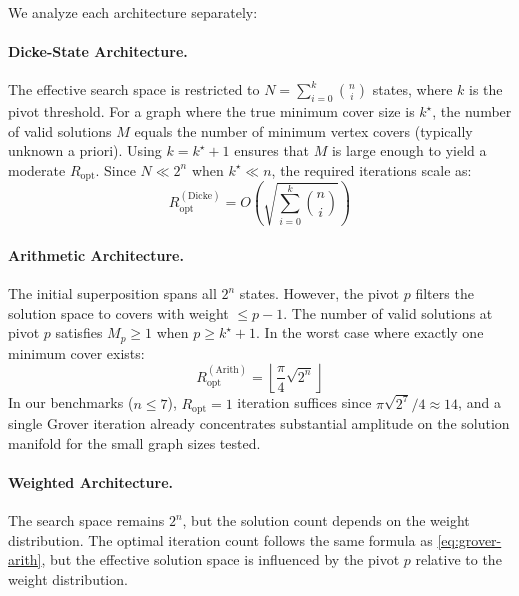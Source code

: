 \documentclass{ieeeaccess}
\begin{document}
We analyze each architecture separately:

\paragraph{Dicke-State Architecture.}
The effective search space is restricted to
$N = \sum_{i=0}^{k} \binom{n}{i}$ states, where $k$ is the
pivot threshold. For a graph where the true minimum cover size
is $k^\star$, the number of valid solutions $M$ equals the
number of minimum vertex covers (typically unknown a priori).
Using $k = k^\star + 1$ ensures that $M$ is large enough to
yield a moderate $R_{\mathrm{opt}}$. Since $N \ll 2^n$
when $k^\star \ll n$, the required iterations scale as:
\begin{equation}
    R_{\mathrm{opt}}^{\mathrm{(Dicke)}}
    = O\!\left( \sqrt{ \sum_{i=0}^{k} \binom{n}{i} } \right)
    \label{eq:grover-dicke}
\end{equation}

\paragraph{Arithmetic Architecture.}
The initial superposition spans all $2^n$ states. However,
the pivot $p$ filters the solution space to covers with
weight $\leq p-1$. The number of valid solutions at pivot $p$
satisfies $M_p \geq 1$ when $p \geq k^\star + 1$. In the
worst case where exactly one minimum cover exists:
\begin{equation}
    R_{\mathrm{opt}}^{\mathrm{(Arith)}}
    = \left\lfloor
        \frac{\pi}{4} \sqrt{2^n}
      \right\rfloor
    \label{eq:grover-arith}
\end{equation}
In our benchmarks ($n \leq 7$), $R_{\mathrm{opt}} = 1$
iteration suffices since $\pi \sqrt{2^7} / 4 \approx 14$,
and a single Grover iteration already concentrates
substantial amplitude on the solution manifold for the
small graph sizes tested.

\paragraph{Weighted Architecture.}
The search space remains $2^n$, but the solution count
depends on the weight distribution. The optimal iteration
count follows the same formula as
\eqref{eq:grover-arith}, but the effective solution space
is influenced by the pivot $p$ relative to the weight
distribution.

\end{document}
